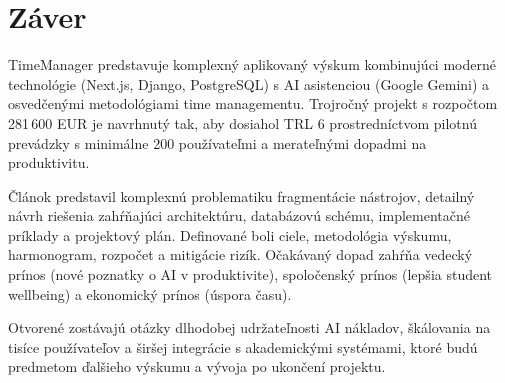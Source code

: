 \documentclass[10pt,twocolumn,twoside,slovak,a4paper]{article}
\begin{document}
\section{Záver}

TimeManager predstavuje komplexný aplikovaný výskum kombinujúci moderné technológie (Next.js, Django, PostgreSQL) s AI asistenciou (Google Gemini) a osvedčenými metodológiami time managementu. Trojročný projekt s rozpočtom 281\,600 EUR je navrhnutý tak, aby dosiahol TRL 6 prostredníctvom pilotnú prevádzky s minimálne 200 používateľmi a merateľnými dopadmi na produktivitu.

Článok predstavil komplexnú problematiku fragmentácie nástrojov, detailný návrh riešenia zahŕňajúci architektúru, databázovú schému, implementačné príklady a projektový plán. Definované boli ciele, metodológia výskumu, harmonogram, rozpočet a mitigácie rizík. Očakávaný dopad zahŕňa vedecký prínos (nové poznatky o AI v produktivite), spoločenský prínos (lepšia student wellbeing) a ekonomický prínos (úspora času).

Otvorené zostávajú otázky dlhodobej udržateľnosti AI nákladov, škálovania na tisíce používateľov a širšej integrácie s akademickými systémami, ktoré budú predmetom ďalšieho výskumu a vývoja po ukončení projektu.



\end{document}
